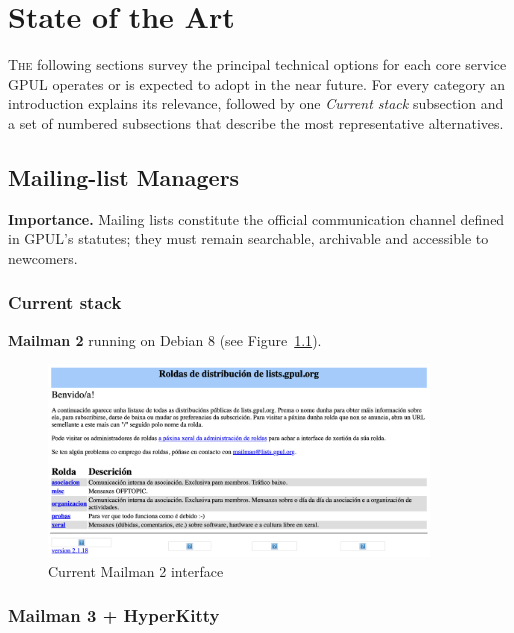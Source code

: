 %

\chapter{State of the Art}
\label{chap:state-of-the-art}

\lettrine{T}{he} following sections survey the principal technical options for each core service GPUL operates or is expected to adopt in the near future.  
For every category an introduction explains its relevance, followed by one \emph{Current stack} subsection and a set of numbered subsections that describe the most representative alternatives.  

\section{Mailing-list Managers}

\textbf{Importance.}  Mailing lists constitute the official communication channel defined in GPUL's statutes; they must remain searchable, archivable and accessible to newcomers.

\subsection{Current stack}
\textbf{Mailman 2} running on Debian 8 (see Figure~\ref{fig:mailman2}).

\begin{figure}[H]
  \centering
  \includegraphics[width=0.9\textwidth]{imaxes/mailman-2-current.png}
  \caption{Current Mailman 2 interface}
  \label{fig:mailman2}
\end{figure}

\subsection{Mailman 3 + HyperKitty}

